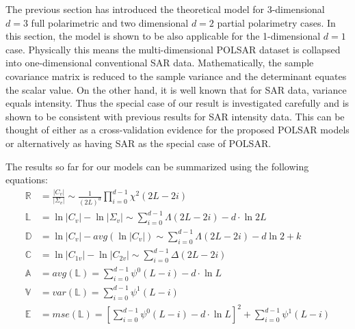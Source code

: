 \documentclass[journal]{IEEEtran}
\begin{document}
The previous section has introduced the theoretical model for 3-dimensional $d=3$ full polarimetric and two dimensional $d=2$ partial polarimetry cases.
In this section, the model is shown to be also applicable for the 1-dimensional $d=1$ case.
Physically this means the multi-dimensional POLSAR dataset is collapsed into one-dimensional conventional SAR data.
Mathematically, the sample covariance matrix is reduced to the sample variance
  and the determinant equates the scalar value.
On the other hand, it is well known that for SAR data, variance equals intensity.
Thus the special case of our result is investigated carefully and is shown to be consistent with previous results for SAR intensity data.
This can be thought of 
  either as a cross-validation evidence for the proposed POLSAR models
  or alternatively as having SAR as the special case of POLSAR. 

The results so far for our models can be summarized using the following equations:
\begin{align}
  \mathbb{R} &= \frac{|C_v|}{|\Sigma_v|} \sim \frac{1}{(2L)^d} \prod^{d-1}_{i=0} \chi^2(2L-2i) \\%
  \mathbb{L} &= \ln{|C_v|} - \ln{|\Sigma_v|} \sim \sum^{d-1}_{i=0} \Lambda(2L-2i) - d \cdot \ln{2L} \\ %
  \mathbb{D} &= \ln{|C_v|} - avg(\ln{|C_v|}) \sim \sum^{d-1}_{i=0} \Lambda(2L-2i) - d \ln{2} + k\\
  \mathbb{C} &= \ln{|C_{1v}|} - \ln{|C_{2v}|} \sim \sum^{d-1}_{i=0} \Delta(2L-2i) \\
  \mathbb{A} &= avg(\mathbb{L}) = \sum^{d-1}_{i=0} \psi^0(L-i) - d \cdot \ln{L} \\ %
  \mathbb{V} &= var(\mathbb{L}) = \sum^{d-1}_{i=0} \psi^1(L-i) \\ %
  \mathbb{E} &= mse(\mathbb{L}) =\left[ \sum^{d-1}_{i=0} \psi^0(L-i) - d \cdot \ln{L} \right]^2 +  \sum^{d-1}_{i=0} \psi^1(L-i) \label{eqn:polsar_dispersion_mse} 
\end{align}
\end{document}
